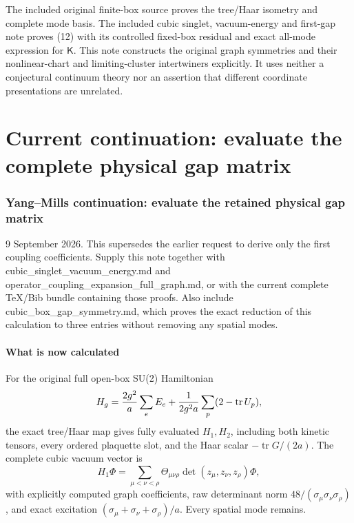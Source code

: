 \documentclass[
  11pt,
]{article}
\begin{document}
The included original finite-box source proves the tree/Haar isometry
and complete mode basis. The included cubic singlet, vacuum-energy and
first-gap note proves (12) with its controlled fixed-box residual and
exact all-mode expression for \(\mathsf K\). This note constructs the
original graph symmetries and their nonlinear-chart and limiting-cluster
intertwiners explicitly. It uses neither a conjectural continuum theory
nor an assertion that different coordinate presentations are unrelated.

\clearpage
\part{Current continuation: evaluate the complete physical gap matrix}
\section{Yang--Mills continuation: evaluate the retained physical gap
matrix}\label{weak-coupling-part-17-yangmills-continuation-evaluate-the-retained-physical-gap-matrix}

9 September 2026. This supersedes the earlier request to derive only the
first coupling coefficients. Supply this note together with
cubic\_singlet\_vacuum\_energy.md and
operator\_coupling\_expansion\_full\_graph.md, or with the current
complete TeX/Bib bundle containing those proofs. Also include
cubic\_box\_gap\_symmetry.md, which proves the exact reduction of this
calculation to three entries without removing any spatial modes.

\subsection{What is now calculated}\label{weak-coupling-part-17-what-is-now-calculated}

For the original full open-box SU(2) Hamiltonian \[
 H_g={2g^2\over a}\sum_eE_e+
           {1\over2g^2a}\sum_p(2-\operatorname{tr}U_p),
\] the exact tree/Haar map gives fully evaluated \(H_1,H_2\), including
both kinetic tensors, every ordered plaquette slot, and the Haar scalar
\(-\operatorname{tr}G/(2a)\). The complete cubic vacuum vector is \[
 H_1\Phi=\sum_{\mu<\nu<\rho}\Theta_{\mu\nu\rho}
                          \det(z_\mu,z_\nu,z_\rho)\Phi ,
\] with explicitly computed graph coefficients, raw determinant norm
\(48/(\sigma_\mu\sigma_\nu\sigma_\rho)\), and exact excitation
\((\sigma_\mu+\sigma_\nu+\sigma_\rho)/a\). Every spatial mode remains.
\end{document}
